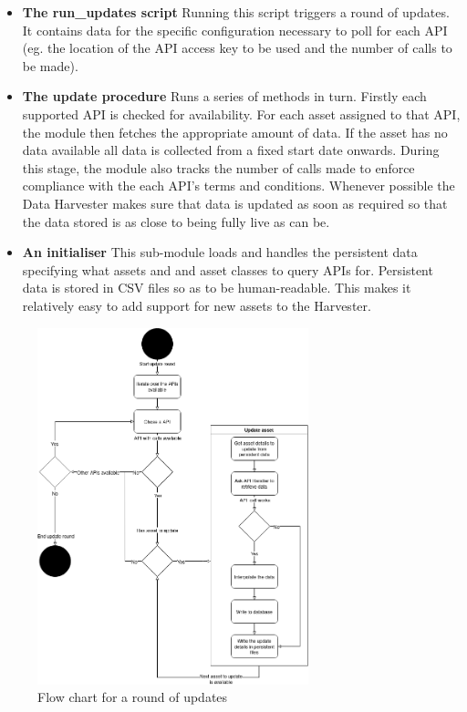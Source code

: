 \documentclass[main.tex]{subfiles}
\begin{document}
\begin{itemize}
    \item \textbf{The run\_updates script} Running this script triggers a round of updates. It contains data for the specific configuration necessary to poll for each API (eg. the location of the API access key to be used and the number of calls to be made).
    \item \textbf{The update procedure} Runs a series of methods in turn. Firstly each supported API is checked for availability. For each asset assigned to that API, the module then fetches the appropriate amount of data. If the asset has no data available all data is collected from a fixed start date onwards. During this stage, the module also tracks the number of calls made to enforce compliance with the each API's terms and conditions. Whenever possible the Data Harvester makes sure that data is updated as soon as required so that the data stored is as close to being fully live as can be.
    \item \textbf{An initialiser} This sub-module loads and handles the persistent data specifying what assets and and asset classes to query APIs for. Persistent data is stored in CSV files so as to be human-readable. This makes it relatively easy to add support for new assets to the Harvester.
\end{itemize}

\begin{figure}[H]
    \centering
    \includegraphics[width=0.7\textwidth]{04Design/04Pictures/update_mechanism_flow_chart.png}
    \caption{Flow chart for a round of updates\cite{TR}}
\end{figure}
\end{document}
